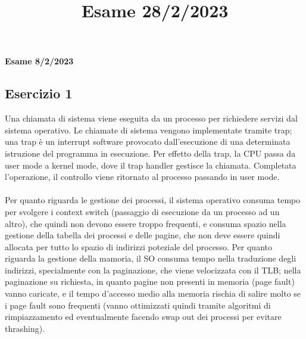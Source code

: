 \documentclass[12pt]{article}
\title{Esame 28/2/2023}
\begin{document}
\begin{center}
    \large\textbf{Esame 8/2/2023}
\end{center}
\subsection*{Esercizio 1}
Una chiamata di sistema viene eseguita da un processo per richiedere servizi dal sistema operativo. Le chiamate di sistema 
vengono implementate tramite trap; una trap è un interrupt software provocato dall'esecuzione di una determinata istruzione 
del programma in esecuzione. Per effetto della trap, la CPU passa da user mode a kernel mode, dove il trap handler gestisce 
la chiamata. Completata l'operazione, il controllo viene ritornato al processo passando in user mode.\\\\
Per quanto riguarda le gestione dei processi, il sistema operativo consuma tempo per svolgere i context switch (passaggio 
di esecuzione da un processo ad un altro), che quindi non devono essere troppo frequenti, e consuma spazio nella gestione 
della tabella dei processi e delle pagine, che non deve essere quindi allocata per tutto lo spazio di indirizzi poteziale 
del processo. Per quanto riguarda la gestione della mamoria, il SO consuma tempo nella traduzione degli indirizzi, 
specialmente con la paginazione, che viene velocizzata con il TLB; nella paginazione su richiesta, in quanto pagine non 
presenti in memoria (page fault) vanno caricate, e il tempo d'accesso medio alla memoria rischia di salire molto se i 
page fault sono frequenti (vanno ottimizzati quindi tramite algoritmi di rimpiazzamento ed eventualmente facendo swap 
out dei processi per evitare thrashing).
\end{document}

